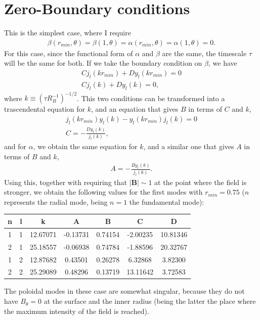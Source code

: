 \documentclass[letterpaper,10pt]{article}
\renewcommand{\vec}[1]{\boldsymbol#1}
\begin{document}
\section*{Zero-Boundary conditions}
This is the simplest case, where I require
\begin{eqnarray}
\beta(r_{min},\theta)=\beta(1,\theta)=\alpha(r_{min},\theta)=\alpha(1,\theta)=0.
\end{eqnarray}
For this case, since the functional form of $\alpha$ and $\beta$ are the same, the timescale $\tau$ will be the same for both. If we take the boundary condition on $\beta$, we have
\begin{eqnarray}
Cj_l(kr_{min})+Dy_l(kr_{min})=0\\
Cj_l(k)+Dy_l(k)=0,
\end{eqnarray}
where $k\equiv(\tau R_B^{-1})^{-1/2}$. This two conditions can be transformed into a trascendental equation for $k$, and an equation that gives $B$ in terms of $C$ and $k$,
\begin{eqnarray}
j_l(kr_{min})y_l(k)-y_l(kr_{min})j_l(k)=0\\
C=-\frac{Dy_l(k)}{j_l(k)},
\end{eqnarray}
and for $\alpha$, we obtain the same equation for $k$, and a similar one that gives $A$ in terms of $B$ and $k$,
\begin{eqnarray}
A=-\frac{By_l(k)}{j_l(k)}.
\end{eqnarray}
Using this, together with requiring that $|\vec{B}|\sim 1$ at the point where the field is stronger, we obtain the following values for the first modes with $r_{min}=0.75$ ($n$ represents the radial mode, being $n=1$ the fundamental mode):
\begin{table}[h!]
\begin{center}
\begin{tabular}{cc|ccccc}
n&l&k&A&B&C&D\\
\hline
1&1& 12.67071 & -0.13731 & 0.74154 & -2.00235 & 10.81346 \\
2&1& 25.18557 & -0.06938 & 0.74784 & -1.88596 & 20.32767\\
1&2& 12.87682 &  0.43501 & 0.26278 &  6.32868 &  3.82300\\
2&2& 25.29089 &  0.48296 & 0.13719 & 13.11642 &  3.72583
\end{tabular}
\end{center}
\end{table}
The poloidal modes in these case are somewhat singular, because they do not have $B_\theta=0$ at the surface and the inner radius (being the latter the place where the maximum intensity of the field is reached).
\end{document}
